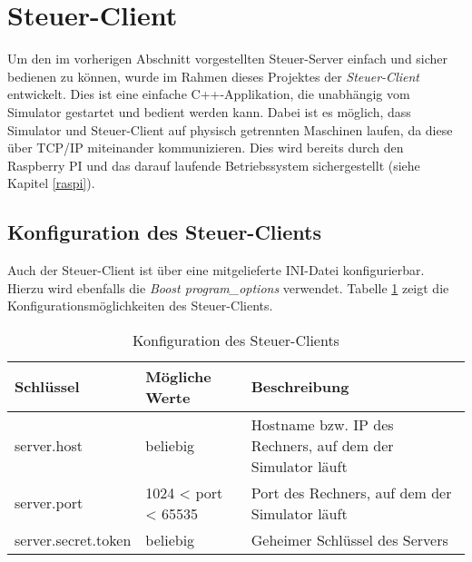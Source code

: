 \section{Steuer-Client}
Um den im vorherigen Abschnitt vorgestellten Steuer-Server einfach und sicher bedienen zu können, wurde im Rahmen dieses Projektes der \emph{Steuer-Client} entwickelt. Dies ist eine einfache C++-Applikation, die unabhängig vom Simulator gestartet und bedient werden kann. Dabei ist es möglich, dass Simulator und Steuer-Client auf physisch getrennten Maschinen laufen, da diese über TCP/IP miteinander kommunizieren. Dies wird bereits durch den Raspberry PI und das darauf laufende Betriebssystem sichergestellt (siehe Kapitel \ref{raspi}). %

\subsection{Konfiguration des Steuer-Clients}
Auch der Steuer-Client ist über eine mitgelieferte INI-Datei konfigurierbar. Hierzu wird ebenfalls die \emph{Boost program\_options} verwendet. %
Tabelle \ref{tab:clientconfig} zeigt die Konfigurationsmöglichkeiten des Steuer-Clients.

\begin{table}[h]
\centering
\begin{tabularx}{\textwidth}{|p{}|p{}|X|}
\hline
\textbf{Schlüssel} & \textbf{Mögliche Werte} & \textbf{Beschreibung} \\ \hline
server.host & beliebig & Hostname bzw. IP des Rechners, auf dem der Simulator läuft \\ \hline
server.port & 1024 < port < 65535 & Port des Rechners, auf dem der Simulator läuft \\ \hline
server.secret.token & beliebig & Geheimer Schlüssel des Servers \\ \hline
\end{tabularx}
\caption{Konfiguration des Steuer-Clients}
\label{tab:clientconfig}
\end{table}